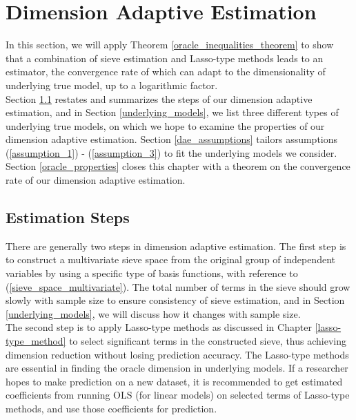 \documentclass[12pt, a4paper]{article}
\theoremstyle{MAstyle} \newtheorem{assumption}{Assumption}[section]
\theoremstyle{MAstyle} \newtheorem{definition}{Definition}[section]
\theoremstyle{MAstyle} \newtheorem{theorem}{Theorem}[section]
\theoremstyle{MAstyle} \newtheorem{corollary}{Corollary}[section]
\begin{document}
        \newpage
        \section{Dimension Adaptive Estimation}\label{dimension_adaptive_estimation}
            In this section, we will apply Theorem \ref{oracle_inequalities_theorem} to show that a combination of sieve estimation and Lasso-type methods leads to an estimator, the convergence rate of which can adapt to the dimensionality of underlying true model, up to a logarithmic factor. \\

            Section \ref{estimation_steps} restates and summarizes the steps of our dimension adaptive estimation, and in Section \ref{underlying_models}, we list three different types of underlying true models, on which we hope to examine the properties of our dimension adaptive estimation. Section \ref{dae_assumptions} tailors assumptions (\ref{assumption_1}) - (\ref{assumption_3}) to fit the underlying models we consider. Section \ref{oracle_properties} closes this chapter with a theorem on the convergence rate of our dimension adaptive estimation.

            \subsection{Estimation Steps}\label{estimation_steps}
                There are generally two steps in dimension adaptive estimation. The first step is to construct a multivariate sieve space from the original group of independent variables by using a specific type of basis functions, with reference to (\ref{sieve_space_multivariate}). The total number of terms in the sieve should grow slowly with sample size to ensure consistency of sieve estimation, and in Section \ref{underlying_models}, we will discuss how it changes with sample size. \\
                
                The second step is to apply Lasso-type methods as discussed in Chapter \ref{lasso-type_method} to select significant terms in the constructed sieve, thus achieving dimension reduction without losing prediction accuracy. The Lasso-type methods are essential in finding the oracle dimension in underlying models. If a researcher hopes to make prediction on a new dataset, it is recommended to get estimated coefficients from running OLS (for linear models) on selected terms of Lasso-type methods, and use those coefficients for prediction. 
\end{document}
